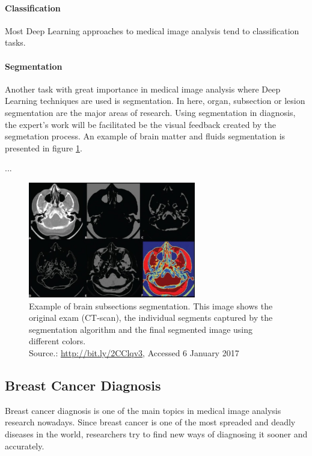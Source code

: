 \documentclass[
  twoside,
  11pt, a4paper,
  footinclude=true,
  headinclude=true,
  cleardoublepage=empty
]{scrbook}
\begin{document}
      \paragraph{Classification}
        Most Deep Learning approaches to medical image analysis tend to classification tasks.

      \paragraph{Segmentation}
        Another task with great importance in medical image analysis where Deep Learning techniques are used is segmentation. In here, organ, subsection or lesion segmentation are the major areas of research. Using segmentation in diagnosis, the expert's work will be facilitated be the visual feedback created by the segmetation process. An example of brain matter and fluids segmentation is presented in figure \ref{background:medical-image:segmentation}.

        ...

        \begin{figure}[t]
          \centering
          \includegraphics[width=0.65\textwidth]{"./img/img-classification-segmentation"}
          \caption[Example of brain subsections segmentation]{Example of brain subsections segmentation. This image shows the original exam (CT-scan), the individual segments captured by the segmentation algorithm and the final segmented image using different colors.
          \\Source.: \href{http://bit.ly/2CClqv3}{http://bit.ly/2CClqv3}, Accessed 6 January 2017}
          \label{background:medical-image:segmentation}
        \end{figure}

      \subsection{Breast Cancer Diagnosis} \label{background:medical-image:breast-cancer-diagnosis}
        Breast cancer diagnosis is one of the main topics in medical image analysis research nowadays. Since breast cancer is one of the most spreaded and deadly diseases in the world, researchers try to find new ways of diagnosing it sooner and accurately.
\end{document}
